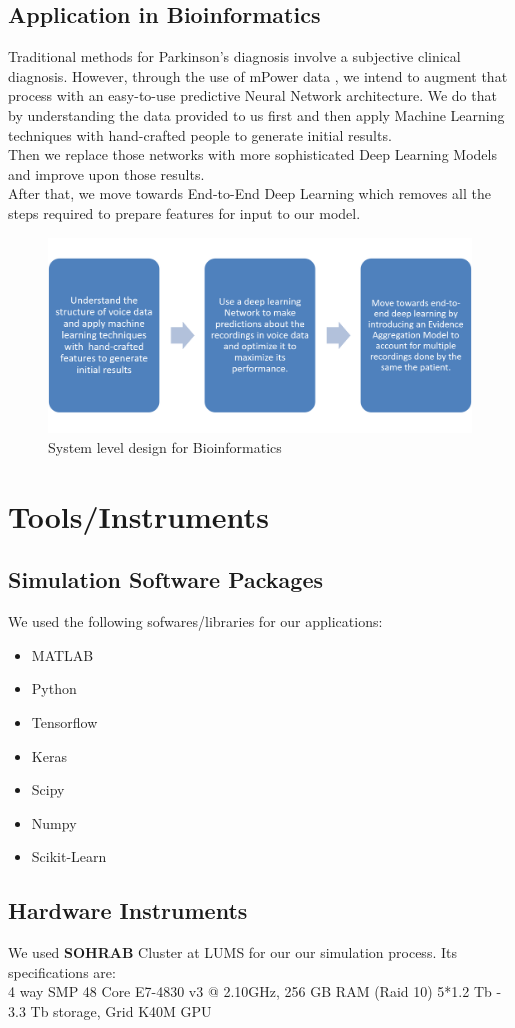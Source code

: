 \subsection{Application in Bioinformatics}
Traditional methods for Parkinson's diagnosis involve a subjective clinical diagnosis. However, through the use of mPower data \cite{bot2016mpower}, we intend to augment that process with an easy-to-use predictive Neural Network architecture. We do that by understanding the data provided to us first and then apply Machine Learning techniques with hand-crafted people to generate initial results.\\
Then we replace those networks with more sophisticated Deep Learning Models and improve upon those results.\\
After that, we move towards End-to-End Deep Learning which removes all the steps required to prepare features for input to our model.
\begin{figure}[htbp]
  \centering
  \includegraphics[width=\textwidth]{./Figures/park_method.png}
  \caption{System level design for Bioinformatics}
  \label{fig:park_method}
\end{figure}
\section{ Tools/Instruments}
\subsection{Simulation Software Packages}
We used the following sofwares/libraries for our applications:
\begin{itemize}
\item MATLAB
\item Python
\item Tensorflow
\item Keras
\item Scipy 
\item Numpy
\item Scikit-Learn
\end{itemize}
\subsection{Hardware Instruments}
We used \textbf{SOHRAB} Cluster at LUMS for our our simulation process. Its specifications are:\\
4 way SMP 48 Core E7-4830 v3 @ 2.10GHz, 256 GB RAM (Raid 10) 5*1.2 Tb - 3.3 Tb storage, Grid K40M GPU

